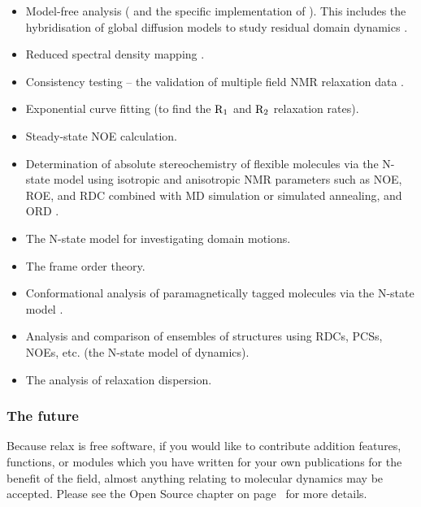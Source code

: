 \begin{itemize}
\item Model-free analysis (\citet{LipariSzabo82a, LipariSzabo82b, Clore90a} and the specific implementation of \citet{dAuvergneGooley03,dAuvergneGooley06,dAuvergneGooley07,dAuvergneGooley08a,dAuvergneGooley08b}).
This includes the hybridisation of global diffusion models to study residual domain dynamics \citep{Horne07}.
\item Reduced spectral density mapping \citep{Farrow95, Lefevre96}.
\item Consistency testing -- the validation of multiple field NMR relaxation data \citep{MorinGagne09a,Fushman99}.
\item Exponential curve fitting (to find the $\mathrm{R}_1$ and $\mathrm{R}_2$ relaxation rates).
\item Steady-state NOE calculation.
\item Determination of absolute stereochemistry of flexible molecules via the N-state model using isotropic and anisotropic NMR parameters such as NOE, ROE, and RDC combined with MD simulation or simulated annealing, and ORD \citep{Sun11}.
\item The N-state model for investigating domain motions.
\item The frame order theory.
\item Conformational analysis of paramagnetically tagged molecules via the N-state model \citep{Erdelyi11}.
\item Analysis and comparison of ensembles of structures using RDCs, PCSs, NOEs, etc. (the N-state model of dynamics).
\item The analysis of relaxation dispersion.
\end{itemize}


\subsubsection{The future}

Because relax is free software, if you would like to contribute addition features, functions, or modules which you have written for your own publications for the benefit of the field, almost anything relating to molecular dynamics may be accepted.
Please see the Open Source chapter on page~\pageref{ch: open source} for more details.




